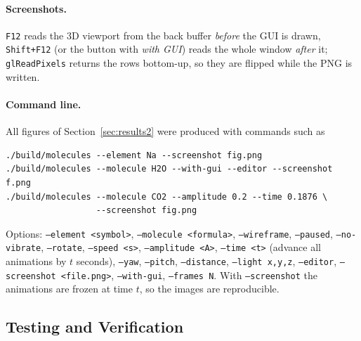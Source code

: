 \documentclass[a4paper, 11pt]{article}
\newcommand{\code}[1]{\texttt{#1}}
\begin{document}
\paragraph{Screenshots.} \code{F12} reads the 3D viewport from the back buffer \emph{before} the GUI is drawn, \code{Shift+F12} (or the button with
\emph{with GUI}) reads the whole window \emph{after} it; \code{glReadPixels} returns the rows bottom-up, so they are flipped while the PNG is written.
\paragraph{Command line.} All figures of Section~\ref{sec:results2} were produced with commands such as
\begin{verbatim}
./build/molecules --element Na --screenshot fig.png
./build/molecules --molecule H2O --with-gui --editor --screenshot f.png
./build/molecules --molecule CO2 --amplitude 0.2 --time 0.1876 \
                  --screenshot fig.png
\end{verbatim}
{\raggedright Options: \code{--element <symbol>}, \code{--molecule <formula>}, \code{--wireframe}, \code{--paused}, \code{--no-vibrate}, \code{--rotate},
\code{--speed <s>}, \code{--amplitude <A>}, \code{--time <t>} (advance all animations by $t$ seconds), \code{--yaw}, \code{--pitch}, \code{--distance},
\code{--light x,y,z}, \code{--editor}, \code{--screenshot <file.png>}, \code{--with-gui}, \code{--frames N}. With \code{--screenshot} the animations
are frozen at time $t$, so the images are reproducible.\par}

\subsection{Testing and Verification}\label{sec:test2}
\end{document}
